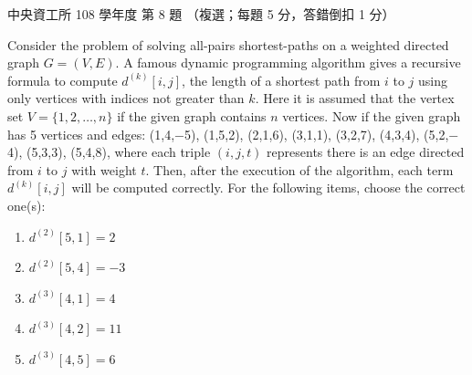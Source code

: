 \begin{pastexam}[label={px:ncu-108-dsa-08}]{中央資工所 108 學年度 第 8 題}
（複選；每題 5 分，答錯倒扣 1 分）

Consider the problem of solving all-pairs shortest-paths on a weighted directed graph $G = (V, E)$. A
famous dynamic programming algorithm gives a recursive formula to compute $d^{(k)}[i, j]$, the length
of a shortest path from $i$ to $j$ using only vertices with indices not greater than $k$. Here it is
assumed that the vertex set $V = \{1, 2, \ldots, n\}$ if the given graph contains $n$ vertices. Now if
the given graph has 5 vertices and edges: (1,4,$-$5), (1,5,2), (2,1,6), (3,1,1), (3,2,7), (4,3,4),
(5,2,$-$4), (5,3,3), (5,4,8), where each triple $(i, j, t)$ represents there is an edge directed from
$i$ to $j$ with weight $t$. Then, after the execution of the algorithm, each term $d^{(k)}[i, j]$ will
be computed correctly. For the following items, choose the correct one(s):
\begin{enumerate}[label=(\Alph*)]
\item $d^{(2)}[5,1] = 2$
\item $d^{(2)}[5,4] = -3$
\item $d^{(3)}[4,1] = 4$
\item $d^{(3)}[4,2] = 11$
\item $d^{(3)}[4,5] = 6$
\end{enumerate}
\end{pastexam}

